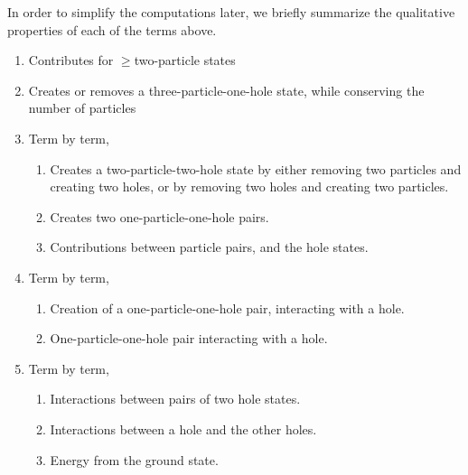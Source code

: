 In order to simplify the computations later, we briefly summarize the qualitative properties of each of the terms above.
\begin{enumerate}[(1).]
    \item Contributes for $\geq$two-particle states
    \item Creates or removes a three-particle-one-hole state, while conserving the number of particles
    \item Term by term,
        \begin{enumerate}
            \item Creates a two-particle-two-hole state by either removing two particles and creating two holes, or by removing two holes and creating two particles.
            \item Creates two one-particle-one-hole pairs.
            \item Contributions between particle pairs, and the hole states.
        \end{enumerate}
    \item Term by term,
        \begin{enumerate}
            \item Creation of a one-particle-one-hole pair, interacting with a hole.
            \item One-particle-one-hole pair interacting with a hole.
        \end{enumerate}
    \item Term by term,
        \begin{enumerate}
            \item Interactions between pairs of two hole states.
            \item Interactions between a hole and the other holes.
            \item Energy from the ground state.
        \end{enumerate}
\end{enumerate}

